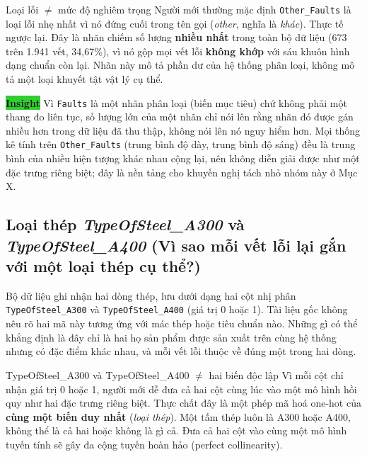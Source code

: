 \documentclass[12pt]{article}
\begin{document}
\begin{misconceptionbox}{Loại lỗi $\neq$ mức độ nghiêm trọng}
Người mới thường mặc định \texttt{Other\_Faults} là loại lỗi nhẹ nhất vì nó đứng cuối trong tên gọi (\textit{other}, nghĩa là \emph{khác}). Thực tế ngược lại. Đây là nhãn chiếm số lượng \textbf{nhiều nhất} trong toàn bộ dữ liệu (673 trên 1.941 vết, 34,67\%), vì nó gộp mọi vết lỗi \textbf{không khớp} với sáu khuôn hình dạng chuẩn còn lại. Nhãn này mô tả phần dư của hệ thống phân loại, không mô tả một loại khuyết tật vật lý cụ thể.
\end{misconceptionbox}

\noindent \colorbox{LimeGreen}{\textbf{Insight}} Vì \texttt{Faults} là một nhãn phân loại (biến mục tiêu) chứ không phải một thang đo liên tục, số lượng lớn của một nhãn chỉ nói lên rằng nhãn đó được gán nhiều hơn trong dữ liệu đã thu thập, không nói lên nó nguy hiểm hơn. Mọi thống kê tính trên \texttt{Other\_Faults} (trung bình độ dày, trung bình độ sáng) đều là trung bình của nhiều hiện tượng khác nhau cộng lại, nên không diễn giải được như một đặc trưng riêng biệt; đây là nền tảng cho khuyến nghị tách nhỏ nhóm này ở Mục X.

\subsection{Loại thép \textit{TypeOfSteel\_A300} và \textit{TypeOfSteel\_A400} (Vì sao mỗi vết lỗi lại gắn với một loại thép cụ thể?)}

Bộ dữ liệu ghi nhận hai dòng thép, lưu dưới dạng hai cột nhị phân \texttt{TypeOfSteel\_A300} và \texttt{TypeOfSteel\_A400} (giá trị 0 hoặc 1). Tài liệu gốc không nêu rõ hai mã này tương ứng với mác thép hoặc tiêu chuẩn nào. Những gì có thể khẳng định là đây chỉ là hai họ sản phẩm được sản xuất trên cùng hệ thống nhưng có đặc điểm khác nhau, và mỗi vết lỗi thuộc về đúng một trong hai dòng.

\begin{misconceptionbox}{TypeOfSteel\_A300 và TypeOfSteel\_A400 $\neq$ hai biến độc lập}
Vì mỗi cột chỉ nhận giá trị 0 hoặc 1, người mới dễ đưa cả hai cột cùng lúc vào một mô hình hồi quy như hai đặc trưng riêng biệt. Thực chất đây là một phép mã hoá one-hot của \textbf{cùng một biến duy nhất} (\emph{loại thép}). Một tấm thép luôn là A300 hoặc A400, không thể là cả hai hoặc không là gì cả. Đưa cả hai cột vào cùng một mô hình tuyến tính sẽ gây đa cộng tuyến hoàn hảo (perfect collinearity).
\end{misconceptionbox}
\end{document}
